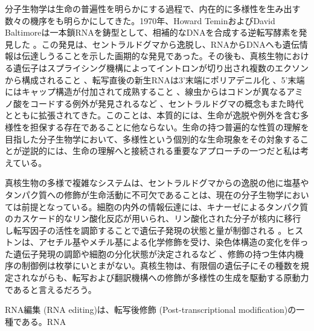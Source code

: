 分子生物学は生命の普遍性を明らかにする過程で、内在的に多様性を生み出す数々の機序をも明らかにしてきた。1970年、Howard TeminおよびDavid Baltimoreは一本鎖RNAを鋳型として、相補的なDNAを合成する逆転写酵素を発見した \citep{TemMiz7006,Bal7006}。この発見は、セントラルドグマから逸脱し、RNAからDNAへも遺伝情報は伝達しうることを示した画期的な発見であった。その後も、真核生物における遺伝子はスプライシング機構によってイントロンが切り出され複数のエクソンから構成されること \citep{ChoGelBro7709}、転写直後の新生RNAは3'末端にポリアデニル化 \citep{EDMABR6004}、5'末端にはキャップ構造が付加されて成熟すること \citep{WeiGerMos7504}、線虫からはコドンが異なるアミノ酸をコードする例外が発見されるなど \citep{HamFujMas1204}、セントラルドグマの概念もまた時代とともに拡張されてきた。このことは、本質的には、生命が逸脱や例外を含む多様性を担保する存在であることに他ならない。生命の持つ普遍的な性質の理解を目指した分子生物学において、多様性という個別的な生命現象をその対象することが逆説的には、生命の理解へと接続される重要なアプローチの一つだと私は考えている。
\par
真核生物の多様で複雑なシステムは、セントラルドグマからの逸脱の他に塩基やタンパク質への修飾が生命活動に不可欠であることは、現在の分子生物学においては前提となっている。細胞の内外の情報伝達には、キナーゼによるタンパク質のカスケード的なリン酸化反応が用いられ、リン酸化された分子が核内に移行し転写因子の活性を調節することで遺伝子発現の状態と量が制御される \citep{Boulikas:1995rm}。ヒストンは、アセチル基やメチル基による化学修飾を受け、染色体構造の変化を伴った遺伝子発現の調節や細胞の分化状態が決定されるなど \citep{Shilatifard:2006rt}、修飾の持つ生体内機序の制御例は枚挙にいとまがない。真核生物は、有限個の遺伝子にその種数を規定されながらも、転写および翻訳機構への修飾が多様性の生成を駆動する原動力であると言えるだろう。
\par
RNA編集 (RNA editing)は、転写後修飾 (Post-transcriptional modification)の一種である。RNA 
